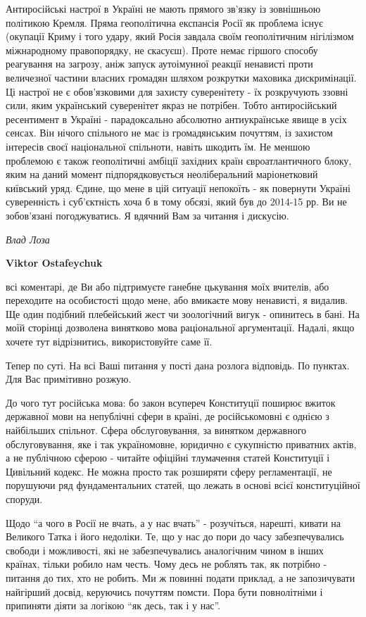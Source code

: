 \begin{itemize}
Антиросійські настрої в Україні не мають прямого зв'язку із зовнішньою
політикою Кремля. Пряма геополітична експансія Росії як проблема існує
(окупації Криму і того удару, який Росія завдала своїм геополітичним нігілізмом
міжнародному правопорядку, не скасуєш). Проте немає гіршого способу реагування
на загрозу, аніж запуск аутоімунної реакції ненависті проти величезної частини
власних громадян шляхом розкрутки маховика дискримінації. Ці настрої не є
обов'язковими для захисту суверенітету - їх розкручують ззовні сили, яким
український суверенітет якраз не потрібен. Тобто антиросійський ресентимент в
Україні - парадоксально абсолютно антиукраїнське явище в усіх сенсах. Він
нічого спільного не має із громадянським почуттям, із захистом інтересів своєї
національної спільноти, навіть шкодить їм. Не меншою проблемою є також
геополітичні амбіції західних країн євроатлантичного блоку, яким на даний
момент підпорядковується неоліберальний маріонетковий київський уряд. Єдине, що
мене в цій ситуації непокоїть - як повернути Україні суверенність і
суб'єктність хоча б в тому обсязі, який був до 2014-15 рр.  Ви не зобов'язані
погоджуватись. Я вдячний Вам за читання і дискусію.

\emph{Влад Лоза}

\textbf{Viktor Ostafeychuk} 

всі коментарі, де Ви або підтримуєте ганебне цькування моїх вчителів, або
переходите на особистості щодо мене, або вмикаєте мову ненависті, я видалив. Ще
один подібний плебейський жест чи зоологічний вигук - опинитесь в бані. На моїй
сторінці дозволена винятково мова раціональної аргументації. Надалі, якщо
хочете тут відрізнитись, використовуйте саме її. 

Тепер по суті. На всі Ваші питання у пості дана розлога відповідь. По пунктах.
Для Вас примітивно розжую.

До чого тут російська мова: бо закон всупереч Конституції поширює вжиток
державної мови на непублічні сфери в країні, де російськомовні є однією з
найбільших спільнот. Сфера обслуговування, за винятком державного
обслуговування, яке і так україномовне, юридично є сукупністю приватних актів,
а не публічною сферою - читайте офіційні тлумачення статей Конституції і
Цивільний кодекс. Не можна просто так розширяти сферу регламентації, не
порушуючи ряд фундаментальних статей, що лежать в основі всієї конституційної
споруди. 

Щодо \enquote{а чого в Росії не вчать, а у нас вчать} - розучіться, нарешті,
кивати на Великого Татка і його недоліки. Те, що у нас до пори до часу
забезпечувались свободи і можливості, які не забезпечувались аналогічним чином
в інших країнах, тільки робило нам честь. Чому десь не роблять так, як потрібно
- питання до тих, хто не робить. Ми ж повинні подати приклад, а не запозичувати
найгірший досвід, керуючись почуттям помсти. Пора бути повнолітніми і припиняти
діяти за логікою \enquote{як десь, так і у нас}. 


\end{itemize}
